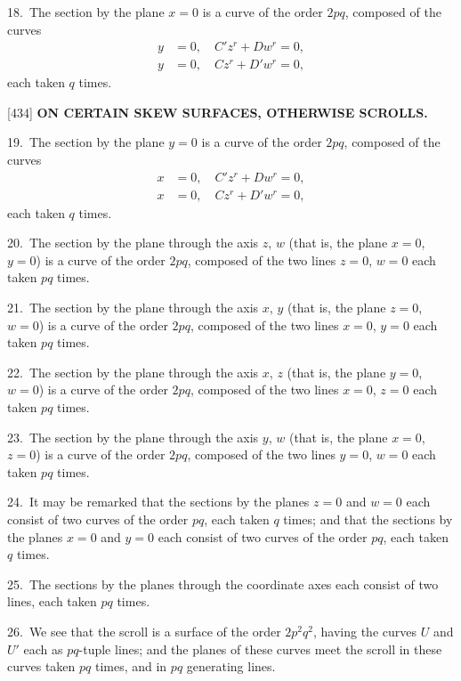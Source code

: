 \documentclass[12pt,a4paper]{article}
\newcommand{\paperref}[1]{\textup{[#1]}}
\theoremstyle{definition}
\begin{document}
18.~The section by the plane $x = 0$ is a curve of the order $2pq$, composed of the curves
\begin{align*}
y &= 0, \quad C'z^r + Dw^r = 0,\\
y &= 0, \quad Cz^r + D'w^r = 0,
\end{align*}
each taken $q$ times.

\newpage
\setcounter{page}{64}

\noindent\paperref{434}\quad
\textbf{ON CERTAIN SKEW SURFACES, OTHERWISE SCROLLS.}

19.~The section by the plane $y = 0$ is a curve of the order $2pq$, composed of the curves
\begin{align*}
x &= 0, \quad C'z^r + Dw^r = 0,\\
x &= 0, \quad Cz^r + D'w^r = 0,
\end{align*}
each taken $q$ times.

20.~The section by the plane through the axis $z$, $w$ (that is, the plane $x = 0$, $y = 0$) is a curve of the order $2pq$, composed of the two lines $z = 0$, $w = 0$ each taken $pq$ times.

21.~The section by the plane through the axis $x$, $y$ (that is, the plane $z = 0$, $w = 0$) is a curve of the order $2pq$, composed of the two lines $x = 0$, $y = 0$ each taken $pq$ times.

22.~The section by the plane through the axis $x$, $z$ (that is, the plane $y = 0$, $w = 0$) is a curve of the order $2pq$, composed of the two lines $x = 0$, $z = 0$ each taken $pq$ times.

23.~The section by the plane through the axis $y$, $w$ (that is, the plane $x = 0$, $z = 0$) is a curve of the order $2pq$, composed of the two lines $y = 0$, $w = 0$ each taken $pq$ times.

24.~It may be remarked that the sections by the planes $z = 0$ and $w = 0$ each consist of two curves of the order $pq$, each taken $q$ times; and that the sections by the planes $x = 0$ and $y = 0$ each consist of two curves of the order $pq$, each taken $q$ times.

25.~The sections by the planes through the coordinate axes each consist of two lines, each taken $pq$ times.

26.~We see that the scroll is a surface of the order $2p^2q^2$, having the curves $U$ and $U'$ each as $pq$-tuple lines; and the planes of these curves meet the scroll in these curves taken $pq$ times, and in $pq$ generating lines.

\newpage
\setcounter{page}{65}
\end{document}
